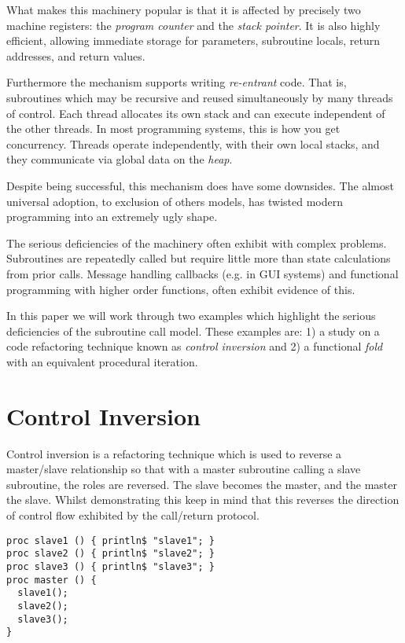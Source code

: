 \documentclass{article}
\begin{document}
What makes this machinery popular is that it is affected by precisely two machine registers: 
  the {\em program counter} and the {\em stack pointer}.
It is also highly efficient, allowing immediate storage for 
  parameters, subroutine locals, return addresses, and return values.

Furthermore the mechanism supports writing {\em re-entrant} code.
That is, subroutines which may be recursive and reused simultaneously by many threads of control.
Each thread allocates its own stack and can execute independent of the other threads.
In most programming systems, this is how you get concurrency.
Threads operate independently, with their own local stacks, and they communicate via global data on the {\em heap}.

Despite being successful, this mechanism does have some downsides. 
The almost universal adoption, to exclusion of others models, has twisted modern programming into an extremely ugly shape.

The serious deficiencies of the machinery often exhibit with complex problems.
Subroutines are repeatedly called but require little more than state calculations from prior calls. 
Message handling callbacks (e.g. in GUI systems) and functional programming with higher order functions, often exhibit evidence of this.

In this paper we will work through two examples which highlight the serious deficiencies of the subroutine call model.
These examples are:
1) a study on a code refactoring technique known as {\em control inversion} and
2) a functional {\em fold} with an equivalent procedural iteration.


\section{Control Inversion}
Control inversion is a refactoring technique which is used
to reverse a master/slave relationship so that with a master subroutine
calling a slave subroutine, the roles are reversed. The slave becomes
the master, and the master the slave. Whilst demonstrating this keep
in mind that this reverses the direction of control flow
exhibited by the call/return protocol.

\begin{verbatim}
proc slave1 () { println$ "slave1"; }
proc slave2 () { println$ "slave2"; }
proc slave3 () { println$ "slave3"; }
proc master () {
  slave1();
  slave2();
  slave3();
}
\end{verbatim}
\end{document}
